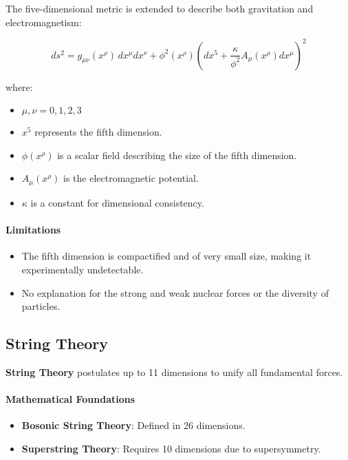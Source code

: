 \documentclass[11pt,a4paper]{article}
\begin{document}
The five-dimensional metric is extended to describe both gravitation and electromagnetism:

\begin{equation}
ds^2 = g_{\mu\nu}(x^\rho) \, dx^\mu dx^\nu + \phi^2(x^\rho) \left( dx^5 + \frac{\kappa}{\phi^2} A_\mu(x^\rho) dx^\mu \right)^2
\end{equation}

where:

\begin{itemize}
    \item $\mu, \nu = 0,1,2,3$
    \item $x^5$ represents the fifth dimension.
    \item $\phi(x^\rho)$ is a scalar field describing the size of the fifth dimension.
    \item $A_\mu(x^\rho)$ is the electromagnetic potential.
    \item $\kappa$ is a constant for dimensional consistency.
\end{itemize}

\paragraph{Limitations}

\begin{itemize}
    \item The fifth dimension is compactified and of very small size, making it experimentally undetectable.
    \item No explanation for the strong and weak nuclear forces or the diversity of particles.
\end{itemize}

\subsection{String Theory}

\textbf{String Theory} postulates up to 11 dimensions to unify all fundamental forces.

\paragraph{Mathematical Foundations}

\begin{itemize}
    \item \textbf{Bosonic String Theory}: Defined in 26 dimensions.
    \item \textbf{Superstring Theory}: Requires 10 dimensions due to supersymmetry.
\end{itemize}
\end{document}
